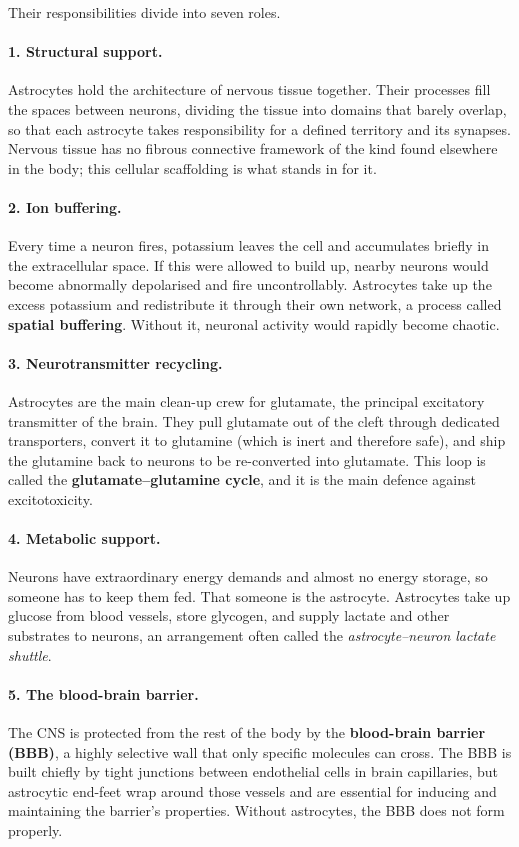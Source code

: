 \documentclass[11pt]{article}
\begin{document}
Their responsibilities divide into seven roles.

\paragraph{1. Structural support.} Astrocytes hold the architecture of nervous tissue together. Their processes fill the spaces between neurons, dividing the tissue into domains that barely overlap, so that each astrocyte takes responsibility for a defined territory and its synapses. Nervous tissue has no fibrous connective framework of the kind found elsewhere in the body; this cellular scaffolding is what stands in for it.

\paragraph{2. Ion buffering.} Every time a neuron fires, potassium leaves the cell and accumulates briefly in the extracellular space. If this were allowed to build up, nearby neurons would become abnormally depolarised and fire uncontrollably. Astrocytes take up the excess potassium and redistribute it through their own network, a process called \textbf{spatial buffering}. Without it, neuronal activity would rapidly become chaotic.

\paragraph{3. Neurotransmitter recycling.} Astrocytes are the main clean-up crew for glutamate, the principal excitatory transmitter of the brain. They pull glutamate out of the cleft through dedicated transporters, convert it to glutamine (which is inert and therefore safe), and ship the glutamine back to neurons to be re-converted into glutamate. This loop is called the \textbf{glutamate--glutamine cycle}, and it is the main defence against excitotoxicity.

\paragraph{4. Metabolic support.} Neurons have extraordinary energy demands and almost no energy storage, so someone has to keep them fed. That someone is the astrocyte. Astrocytes take up glucose from blood vessels, store glycogen, and supply lactate and other substrates to neurons, an arrangement often called the \textit{astrocyte--neuron lactate shuttle}.

\paragraph{5. The blood-brain barrier.} The CNS is protected from the rest of the body by the \textbf{blood-brain barrier (BBB)}, a highly selective wall that only specific molecules can cross. The BBB is built chiefly by tight junctions between endothelial cells in brain capillaries, but astrocytic end-feet wrap around those vessels and are essential for inducing and maintaining the barrier's properties. Without astrocytes, the BBB does not form properly.
\end{document}
